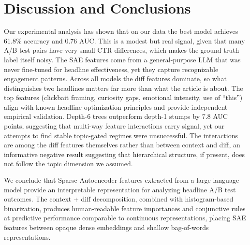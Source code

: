 \documentclass[sigconf,natbib=false, language=english]{acmart}
\begin{document}


\section{Discussion and Conclusions}
Our experimental analysis has shown that on our data the best model achieves 61.8\%
accuracy and 0.76 AUC. This is a modest but real signal, given that many A/B test pairs
have very small CTR differences, which makes the ground-truth label itself noisy. The
SAE features come from a general-purpose LLM that was never fine-tuned for headline
effectiveness, yet they capture recognizable engagement patterns. Across all models the
diff features dominate, so what distinguishes two headlines matters far more than what
the article is about. The top features (clickbait framing, curiosity gaps, emotional
intensity, use of ``this'') align with known headline optimization principles and
provide independent empirical validation. Depth-6 trees outperform depth-1 stumps by
7.8 AUC points, suggesting that multi-way feature interactions carry signal, yet our
attempts to find stable topic-gated regimes were unsuccessful. The interactions are
among the diff features themselves rather than between context and diff, an informative
negative result suggesting that hierarchical structure, if present, does not follow the
topic dimension we assumed.

We conclude that Sparse Autoencoder features extracted from a large language model
provide an interpretable representation for analyzing headline A/B test outcomes. The
context + diff decomposition, combined with histogram-based binarization, produces
human-readable feature importances and conjunctive rules at predictive performance
comparable to continuous representations, placing SAE features between opaque dense
embeddings and shallow bag-of-words representations.
\end{document}
